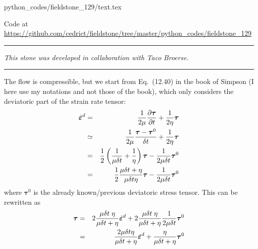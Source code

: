 \begin{flushright} {\tiny {\color{gray} python\_codes/fieldstone\_129/text.tex}} \end{flushright}



\begin{center}
\inpython
Code at \url{https://github.com/cedrict/fieldstone/tree/master/python_codes/fieldstone_129}
\end{center}

\par\noindent\rule{\textwidth}{0.4pt}

{\sl This stone was developed in collaboration with Taco Broerse}. 

\par\noindent\rule{\textwidth}{0.4pt}

The flow is compressible, but 
we start from Eq.~(12.40) in the book of Simpson (I here use my notations
and not those of the book), which only considers the deviatoric part of the 
strain rate tensor:
\begin{eqnarray}
\dot{\bm\varepsilon}^d
&=&\frac{1}{2\mu} \frac{\partial \bm\tau}{\partial t}
+\frac{1}{2\eta} \bm\tau \nonumber\\
&\simeq&
\frac{1}{2\mu} \frac{\bm\tau - \bm\tau^0}{\delta t}
+\frac{1}{2\eta} \bm\tau \nonumber\\
&=&
\frac12 \left( \frac{1}{\mu \delta t} + \frac{1}{\eta} \right) {\bm\tau}
-\frac{1}{2\mu \delta t} \bm\tau^0\nonumber\\
&=&
\frac12 \frac{ \mu\delta t +\eta}{\mu \delta t \eta}  {\bm\tau}
-\frac{1}{2\mu \delta t} \bm\tau^0
\end{eqnarray}
where ${\bm \tau}^0$ is the already known/previous deviatoric stress tensor. This can be rewritten as
\begin{eqnarray}
\bm\tau 
&=&
2  \frac{\mu \delta t \; \eta}{ \mu\delta t +\eta} \dot{\bm\varepsilon}^d 
+
2 \frac{\mu \delta t \; \eta}{\mu\delta t + \eta} \frac{1}{2\mu \delta t} \bm\tau^0
\nonumber\\
&=&
\frac{2 \mu \delta t \eta}{ \mu\delta t +\eta} \dot{\bm\varepsilon}^d 
+
\frac{ \eta}{\mu\delta t + \eta}  \bm\tau^0 \label{tau_simp1}
\end{eqnarray}

